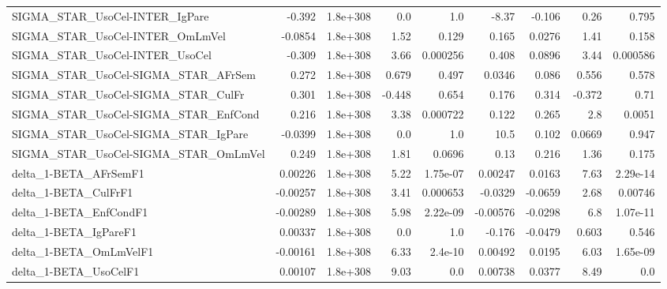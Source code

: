 \begin{tabular}{lrrrrrrrr}
SIGMA\_STAR\_UsoCel-INTER\_IgPare        &      -0.392 &     1.8e+308 &      0.0 &      1.0 &      -8.37 &      -0.106 &         0.26 &         0.795 \\
SIGMA\_STAR\_UsoCel-INTER\_OmLmVel       &     -0.0854 &     1.8e+308 &     1.52 &    0.129 &      0.165 &      0.0276 &         1.41 &         0.158 \\
SIGMA\_STAR\_UsoCel-INTER\_UsoCel        &      -0.309 &     1.8e+308 &     3.66 & 0.000256 &      0.408 &      0.0896 &         3.44 &      0.000586 \\
SIGMA\_STAR\_UsoCel-SIGMA\_STAR\_AFrSem   &       0.272 &     1.8e+308 &    0.679 &    0.497 &     0.0346 &       0.086 &        0.556 &         0.578 \\
SIGMA\_STAR\_UsoCel-SIGMA\_STAR\_CulFr    &       0.301 &     1.8e+308 &   -0.448 &    0.654 &      0.176 &       0.314 &       -0.372 &          0.71 \\
SIGMA\_STAR\_UsoCel-SIGMA\_STAR\_EnfCond  &       0.216 &     1.8e+308 &     3.38 & 0.000722 &      0.122 &       0.265 &          2.8 &        0.0051 \\
SIGMA\_STAR\_UsoCel-SIGMA\_STAR\_IgPare   &     -0.0399 &     1.8e+308 &      0.0 &      1.0 &       10.5 &       0.102 &       0.0669 &         0.947 \\
SIGMA\_STAR\_UsoCel-SIGMA\_STAR\_OmLmVel  &       0.249 &     1.8e+308 &     1.81 &   0.0696 &       0.13 &       0.216 &         1.36 &         0.175 \\
delta\_1-BETA\_AFrSemF1                 &     0.00226 &     1.8e+308 &     5.22 & 1.75e-07 &    0.00247 &      0.0163 &         7.63 &      2.29e-14 \\
delta\_1-BETA\_CulFrF1                  &    -0.00257 &     1.8e+308 &     3.41 & 0.000653 &    -0.0329 &     -0.0659 &         2.68 &       0.00746 \\
delta\_1-BETA\_EnfCondF1                &    -0.00289 &     1.8e+308 &     5.98 & 2.22e-09 &   -0.00576 &     -0.0298 &          6.8 &      1.07e-11 \\
delta\_1-BETA\_IgPareF1                 &     0.00337 &     1.8e+308 &      0.0 &      1.0 &     -0.176 &     -0.0479 &        0.603 &         0.546 \\
delta\_1-BETA\_OmLmVelF1                &    -0.00161 &     1.8e+308 &     6.33 &  2.4e-10 &    0.00492 &      0.0195 &         6.03 &      1.65e-09 \\
delta\_1-BETA\_UsoCelF1                 &     0.00107 &     1.8e+308 &     9.03 &      0.0 &    0.00738 &      0.0377 &         8.49 &           0.0 \\

\end{tabular}
